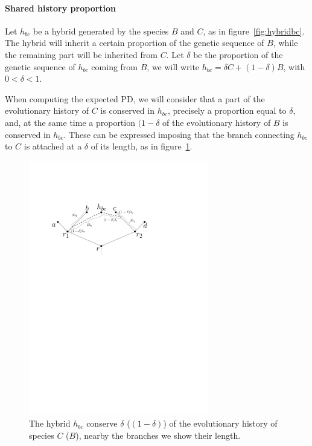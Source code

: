 \documentclass[12pt,a4paper]{report}
\begin{document}
\paragraph{Shared history proportion}
Let $h_{bc}$ be a hybrid generated by the species $B$ and $C$, as in figure~\ref{fig:hybridbc}. The hybrid will inherit a certain proportion of the genetic sequence of $B$, while the remaining part will be inherited from $C$. Let $\delta$ be the proportion of the genetic sequence of $h_{bc}$ coming from $B$, we will write $h_{bc}=\delta C + (1-\delta)B$, with $0 < \delta <1$.

When computing the expected PD, we will consider that a part of the evolutionary history of $C$ is conserved in $h_{bc}$, precisely a proportion equal to $\delta$, and, at the same time a proportion $(1-\delta$ of the evolutionary history of $B$ is conserved in $h_{bc}$. These can be expressed imposing that the branch connecting $h_{bc}$ to $C$ is attached at a $\delta$ of its length, as in figure~\ref{fig:hybridbcdeltalambda}.

\begin{figure}[ht]
	\centering
		\includegraphics[width=0.7\textwidth]{images/hybridbcdeltalambda}
		\caption{The hybrid $h_{bc}$ conserve $\delta$ ($(1-\delta)$) of the evolutionary history of species $C$ ($B$), nearby the branches we show their length.}
		\label{fig:hybridbcdeltalambda}
\end{figure}
\end{document}
